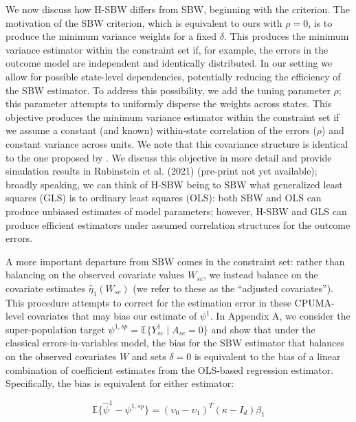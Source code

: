 \documentclass[aoas]{imsart}
\theoremstyle{plain}
\theoremstyle{remark}
\begin{document}
We now discuss how H-SBW differs from SBW, beginning with the criterion. The motivation of the SBW criterion, which is equivalent to ours with $\rho = 0$, is to produce the minimum variance weights for a fixed $\delta$. This produces the minimum variance estimator within the constraint set if, for example, the errors in the outcome model are independent and identically distributed. In our setting we allow for possible state-level dependencies, potentially reducing the efficiency of the SBW estimator. To address this possibility, we add the tuning parameter $\rho$; this parameter attempts to uniformly disperse the weights across states. This objective produces the minimum variance estimator within the constraint set if we assume a constant (and known) within-state correlation of the errors ($\rho$) and constant variance across units. We note that this covariance structure is identical to the one proposed by \cite{kloek1981ols}. We discuss this objective in more detail and provide simulation results in Rubinstein et al. (2021) (pre-print not yet available); broadly speaking, we can think of H-SBW being to SBW what generalized least squares (GLS) is to ordinary least squares (OLS): both SBW and OLS can produce unbiased estimates of model parameters; however, H-SBW and GLS can produce efficient estimators under assumed correlation structures for the outcome errors.

A more important departure from SBW comes in the constraint set: rather than balancing on the observed covariate values $W_{sc}$, we instead balance on the covariate estimates $\hat{\eta}_1(W_{sc})$ (we refer to these as the ``adjusted covariates''). This procedure attempts to correct for the estimation error in these CPUMA-level covariates that may bias our estimate of $\psi^1$. In Appendix A, we consider the super-population target $\psi^{1, sp} = \mathbb{E}\{Y_{sc}^1 \mid A_{sc} = 0\}$ and show that under the classical errors-in-variables model, the bias for the SBW estimator that balances on the observed covariates $W$ and sets $\delta = 0$ is equivalent to the bias of a linear combination of coefficient estimates from the OLS-based regression estimator. Specifically, the bias is equivalent for either estimator:

\begin{equation}
\mathbb{E}\{\hat{\psi}^{1} - \psi^{1, sp}\} = (\upsilon_0 - \upsilon_1)^T(\kappa - I_d)\beta_1
\end{equation}
\end{document}
